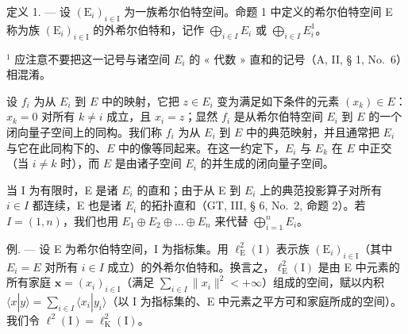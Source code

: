 定义 1. --- 设 \((\mathrm{E}_{i})_{i\in\mathrm{I}}\) 为一族希尔伯特空间。命题 1 中定义的希尔伯特空间 E 称为族 \((\mathrm{E}_{i})_{i\in\mathrm{I}}\) 的外希尔伯特和，记作 \(\bigoplus_{i\in I} E_{i}\) 或 \(\bigoplus_{i\in I} E_{i}^{1}\)。

\(^{1}\) 应注意不要把这一记号与诸空间 \(E_{i}\) 的 « 代数 » 直和的记号（A, II, § 1, No.~6）相混淆。

设 \(f_{i}\) 为从 \(E_{i}\) 到 \(E\) 中的映射，它把 \(z \in E_{i}\) 变为满足如下条件的元素 \((x_{k}) \in E\)：\(x_{k} = 0\) 对所有 \(k \neq i\) 成立，且 \(x_{i} = z\)；显然 \(f_{i}\) 是从希尔伯特空间 \(E_{i}\) 到 \(E\) 的一个闭向量子空间上的同构。我们称 \(f_{i}\) 为从 \(E_{i}\) 到 \(E\) 中的典范映射，并且通常把 \(E_{i}\) 与它在此同构下的、\(E\) 中的像等同起来。在这一约定下，\(E_{i}\) 与 \(E_{k}\) 在 \(E\) 中正交（当 \(i \neq k\) 时），而 \(E\) 是由诸子空间 \(E_{i}\) 的并生成的闭向量子空间。

当 I 为有限时，E 是诸 \(E_{i}\) 的直和；由于从 E 到 \(E_{i}\) 上的典范投影算子对所有 \(i \in I\) 都连续，E 也是诸 \(E_{i}\) 的拓扑直和（GT, III, § 6, No.~2, 命题 2）。若 \(I = \left(1, n\right)\)，我们也用 \(E_{1} \oplus E_{2} \oplus \ldots \oplus E_{n}\) 来代替 \(\bigoplus_{i=1}^{n} E_{i}\)。

例. --- 设 E 为希尔伯特空间，I 为指标集。用 \(\ell_{\mathrm{E}}^{2}(\mathrm{I})\) 表示族 \((\mathrm{E}_{i})_{i\in\mathrm{I}}\)（其中 \(E_{i}=E\) 对所有 \(i\in I\) 成立）的外希尔伯特和。换言之，\(\ell_{\mathrm{E}}^{2}(\mathrm{I})\) 是由 E 中元素的所有家庭 \(\mathbf{x}=(x_{i})_{i\in\mathrm{I}}\)（满足 \(\sum_{i\in I}\|x_{i}\|^{2}<+\infty\)）组成的空间，赋以内积 \(\langle x|y\rangle=\sum_{i\in I}\langle x_{i}|y_{i}\rangle\)（以 I 为指标集的、E 中元素之平方可和家庭所成的空间）。我们令 \(\ell^{2}(\mathrm{I})=\ell_{\mathrm{K}}^{2}(\mathrm{I})\)。

